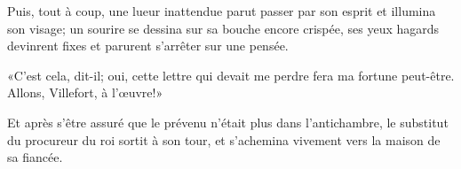 Puis, tout à coup, une lueur inattendue parut passer par son esprit et illumina son visage; un sourire se dessina sur sa bouche encore crispée, ses yeux hagards devinrent fixes et parurent s'arrêter sur une pensée.

«C'est cela, dit-il; oui, cette lettre qui devait me perdre fera ma fortune peut-être. Allons, Villefort, à l'œuvre!»

Et après s'être assuré que le prévenu n'était plus dans l'antichambre, le substitut du procureur du roi sortit à son tour, et s'achemina vivement vers la maison de sa fiancée.




